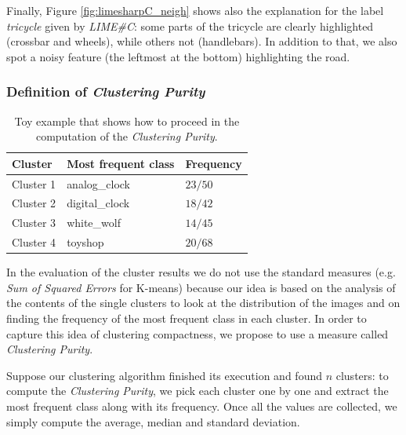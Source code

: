 \documentclass[12pt, twoside, a4paper]{report}
\begin{document}

Finally, Figure \ref{fig:limesharpC_neigh} shows also the explanation for the label \textit{tricycle} given by \textit{LIME\#C}: some parts of the tricycle are clearly highlighted (crossbar and wheels), while others not (handlebars). In addition to that, we also spot a noisy feature (the leftmost at the bottom) highlighting the road.


\subsubsection{Definition of \textit{Clustering Purity}}

\begin{table}[]
\centering
\def\arraystretch{1.3}
\begin{tabular}{|l|l|l|}
\hline
\textbf{Cluster} & \textbf{Most frequent class} & \textbf{Frequency} \\\hline
Cluster 1 & analog\_clock & $23/50$ \\\hline
Cluster 2 & digital\_clock & $18/42$ \\\hline
Cluster 3 & white\_wolf & $14/45$ \\\hline
Cluster 4 & toyshop & $20/68$\\\hline
\end{tabular}
\caption{Toy example that shows how to proceed in the computation of the \textit{Clustering Purity}.}
\label{tab:cluster_purity_example}
\end{table}

In the evaluation of the cluster results we do not use the standard measures (e.g. \textit{Sum of Squared Errors} for K-means) because our idea is based on the analysis of the contents of the single clusters to look at the distribution of the images and on finding the frequency of the most frequent class in each cluster. In order to capture this idea of clustering compactness, we propose to use a measure called \textit{Clustering Purity}. 

Suppose our clustering algorithm finished its execution and found $n$ clusters: to compute the \textit{Clustering Purity}, we pick each cluster one by one and extract the most frequent class along with its frequency. Once all the values are collected, we simply compute the average, median and standard deviation.
\end{document}
